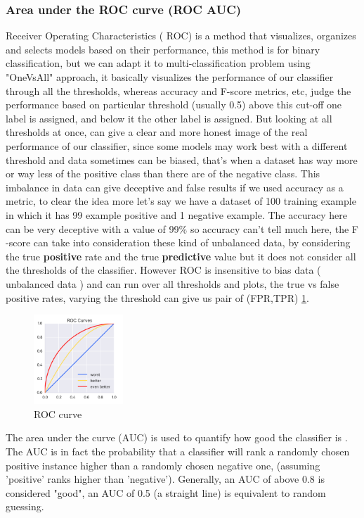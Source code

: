 \subsubsection{Area under the ROC curve (ROC AUC)}
Receiver Operating Characteristics  ( ROC) is a method that visualizes, organizes and selects models based on  their performance,  this method is for binary classification, but we can adapt it to multi-classification problem  using "OneVsAll" approach, it basically  visualizes the performance of our classifier through all the thresholds, whereas accuracy and F-score  metrics, etc, judge the performance based on particular threshold (usually  0.5) above this cut-off one label is assigned, and below it the other label is assigned. But  looking at all thresholds at once, can give a clear and more honest image of the real performance of our classifier,  since  some models may work best with a different threshold and data sometimes can be biased,   that's when  a dataset has way more or way less of the positive class than there are of the negative class. This imbalance in data can give deceptive and false results if we used accuracy as a metric, to clear the idea more let's say we have a dataset of 100 training example in which it  has 99 example positive and 1 negative example.  The accuracy here can be very deceptive with a value of 99\% so accuracy can't tell much here, the F$\textbf{-}$score can take  into consideration these kind of unbalanced data,  by considering  the true \textbf{positive } rate and the true \textbf{predictive} value  but  it does  not consider all the thresholds of the classifier. However  ROC  is insensitive to bias data ( unbalanced data ) and can run over all thresholds and plots, the  true vs false positive rates, varying the threshold can give us pair of (FPR,TPR) \ref{fig:bias2}.
\begin{figure}[H]
\centering
\includegraphics[width=0.3\textwidth]{img/roc.jpg}
\caption{ ROC curve }
\label{fig:bias2}
\end{figure}
The area under the curve (AUC) is used to quantify how good the classifier  is .  The AUC is in fact  the probability that a classifier will rank a randomly chosen positive instance higher than a randomly chosen negative one, (assuming 'positive' ranks higher than 'negative'). Generally, an AUC of above 0.8 is considered "good", an AUC of 0.5 (a straight line) is equivalent to random guessing.


